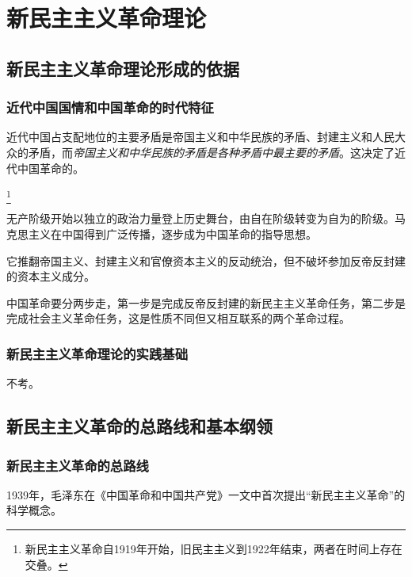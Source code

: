 \chapter{新民主主义革命理论}\label{Chapter:新民主主义革命理论}


\section{新民主主义革命理论形成的依据}

    \subsection{近代中国国情和中国革命的时代特征}
    近代中国占支配地位的主要矛盾是帝国主义和中华民族的矛盾、封建主义和人民大众的矛盾，而\emph{帝国主义和中华民族的矛盾是各种矛盾中最主要的矛盾}。这决定了近代中国革命的。


    \footnote{新民主主义革命自1919年开始，旧民主主义到1922年结束，两者在时间上存在交叠。}

    无产阶级开始以独立的政治力量登上历史舞台，由自在阶级转变为自为的阶级。马克思主义在中国得到广泛传播，逐步成为中国革命的指导思想。

    它推翻帝国主义、封建主义和官僚资本主义的反动统治，但不破坏参加反帝反封建的资本主义成分。

    中国革命要分两步走，第一步是完成反帝反封建的新民主主义革命任务，第二步是完成社会主义革命任务，这是性质不同但又相互联系的两个革命过程。

    \subsection{新民主主义革命理论的实践基础}
    不考。


\section{新民主主义革命的总路线和基本纲领}

    \subsection{新民主主义革命的总路线}
    1939年，毛泽东在《中国革命和中国共产党》一文中首次提出“新民主主义革命”的科学概念。

